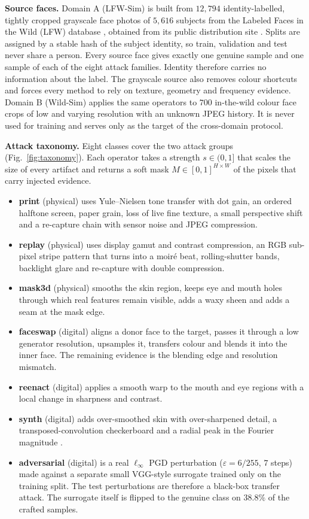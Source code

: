\documentclass[conference]{IEEEtran}
\begin{document}
\textbf{Source faces.} Domain A (LFW-Sim) is built from $12{,}794$ identity-labelled,
tightly cropped grayscale face photos of $5{,}616$ subjects from the Labeled Faces in
the Wild (LFW) database \cite{huang2007lfw}, obtained from its public distribution
site \cite{lfwweb}. Splits are assigned by a stable hash of the subject identity, so
train, validation and test never share a person. Every source face gives exactly one
genuine sample and one sample of each of the eight attack families. Identity therefore
carries no information about the label. The grayscale source also removes colour
shortcuts and forces every method to rely on texture, geometry and frequency evidence.
Domain B (Wild-Sim) applies the same operators to $700$ in-the-wild colour face crops \cite{wildsim}
of low and varying resolution with an unknown JPEG history. It is never used for
training and serves only as the target of the cross-domain protocol.

\textbf{Attack taxonomy.} Eight classes cover the two attack groups
(Fig.~\ref{fig:taxonomy}). Each operator takes a strength $s\in(0,1]$ that scales the
size of every artifact and returns a soft mask $M\in[0,1]^{H\times W}$ of the pixels
that carry injected evidence.
\begin{itemize}
\item \textbf{print} (physical) uses Yule--Nielsen tone transfer with dot gain, an
      ordered halftone screen, paper grain, loss of live fine texture, a small
      perspective shift and a re-capture chain with sensor noise and JPEG compression.
\item \textbf{replay} (physical) uses display gamut and contrast compression, an RGB
      sub-pixel stripe pattern that turns into a moir\'e beat, rolling-shutter bands,
      backlight glare and re-capture with double compression.
\item \textbf{mask3d} (physical) smooths the skin region, keeps eye and mouth holes
      through which real features remain visible, adds a waxy sheen and adds a seam at
      the mask edge.
\item \textbf{faceswap} (digital) aligns a donor face to the target, passes it through
      a low generator resolution, upsamples it, transfers colour and blends it into the
      inner face. The remaining evidence is the blending edge and resolution mismatch.
\item \textbf{reenact} (digital) applies a smooth warp to the mouth and eye regions
      with a local change in sharpness and contrast.
\item \textbf{synth} (digital) adds over-smoothed skin with over-sharpened detail, a
      transposed-convolution checkerboard \cite{odena2016checkerboard} and a radial
      peak in the Fourier magnitude \cite{frank2020frequency}.
\item \textbf{adversarial} (digital) is a real $\ell_\infty$ PGD perturbation
      ($\varepsilon=6/255$, $7$ steps) \cite{madry2018pgd} made against a separate
      small VGG-style surrogate trained only on the training split. The test
      perturbations are therefore a black-box transfer attack. The surrogate itself is
      flipped to the genuine class on $38.8\%$ of the crafted samples.
\end{itemize}
\end{document}
